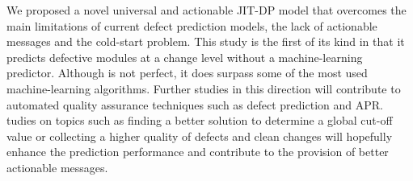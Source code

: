 We proposed a novel universal and actionable JIT-DP model that overcomes the main limitations of current defect prediction models, the lack of actionable messages and the cold-start problem.
This study is the first of its kind in that it predicts defective modules at a change level without a machine-learning predictor. 
Although {\simfinmo} is not perfect, it does surpass some of the most used machine-learning algorithms.
Further studies in this direction will contribute to automated quality assurance techniques such as defect prediction and APR.
tudies on topics such as finding a better solution to determine a global cut-off value or collecting a higher quality of defects and clean changes will hopefully enhance the prediction performance and contribute to the provision of better actionable messages.